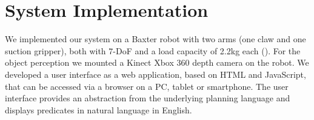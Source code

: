 %



\section{System Implementation}
\label{sec:system}
We implemented our system on a Baxter robot with two arms (one claw and one suction gripper), both with 7-DoF and a load capacity of 2.2kg each ().
For the object perception we mounted a Kinect Xbox 360 depth camera on the robot.
We developed a user interface as a web application, based on HTML and JavaScript, that can be accessed via a browser on a PC, tablet or smartphone.
The user interface provides an abstraction from the underlying planning language and displays predicates in natural language in English.

